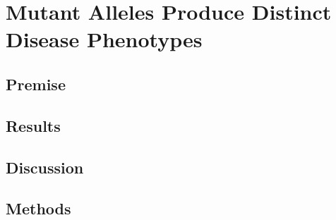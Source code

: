 \chapter{Mutant  Alleles Produce Distinct Disease Phenotypes}

\section{Premise}
\section{Results}
\section{Discussion}
\section{Methods}

